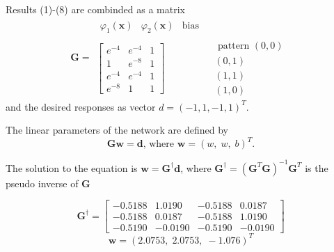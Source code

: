 \begin{enumerate}
\begin{solution}
    Results (1)-(8) are combinded as a matrix
    \begin{equation*}
      \mathbf{G}=\begin{array}{cl}
        \begin{array}{ccc}
          \varphi_1(\mathbf{x})&\varphi_2(\mathbf{x})&\mbox{bias}
        \end{array} &\\
        \left[
          \begin{array}{ccc}
            e^{-4} & e^{-4} & 1\\
            1 & e^{-8}& 1\\
            e^{-4} & e^{-4} & 1\\
            e^{-8}& 1 & 1
          \end{array}
        \right] &
        \begin{array}{r}
          \mbox{ pattern }(0,0)\\
          (0,1)\\
          (1,1)\\
          (1,0)
        \end{array}
      \end{array}
    \end{equation*}
    and the desired responses as vector $d=(-1,1,-1,1)^T$.

    The linear parameters of the network are defined by
    \begin{equation*}
      \mathbf{Gw}=\mathbf{d}\mbox{, where }\mathbf{w}=(w,\;w,\;b)^T.
    \end{equation*}

    The solution to the equation is
    $\mathbf{w}=\mathbf{G}^\dagger\mathbf{d}$, where $\mathbf{G}^\dagger=(\mathbf{G}^T\mathbf{G})^{-1}\mathbf{G}^T$
    is the pseudo inverse of $\mathbf{G}$

    \begin{equation*}
      \mathbf{G}^\dagger=
      \left[
        \begin{array}{rrrr}
          -0.5188 & 1.0190 & -0.5188 &0.0187\\
          -0.5188 & 0.0187 & -0.5188 &1.0190\\
          -0.5190 & -0.0190 & -0.5190 &-0.0190
        \end{array}\right]
    \end{equation*}
    \begin{equation*}
      \mathbf{w}=(2.0753,\;2.0753,\;-1.076)^T
    \end{equation*}



\end{solution}
\end{enumerate}
